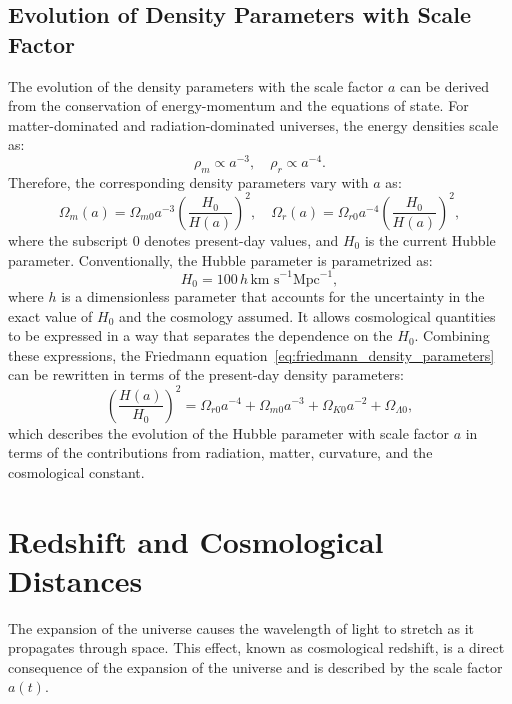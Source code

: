 \subsection{Evolution of Density Parameters with Scale Factor}
The evolution of the density parameters with the scale factor \( a \) can be derived from the conservation of energy-momentum and the equations of state. For matter-dominated and radiation-dominated universes, the energy densities scale as:
\begin{equation}
    \rho_m \propto a^{-3}, \quad \rho_r \propto a^{-4}.
    \label{eq:energy_density_scaling}
\end{equation}
Therefore, the corresponding density parameters vary with \( a \) as:
\begin{equation}
    \Omega_m(a) = \Omega_{m0} a^{-3} \left( \frac{H_0}{H(a)} \right)^2, \quad \Omega_r(a) = \Omega_{r0} a^{-4} \left( \frac{H_0}{H(a)} \right)^2,
    \label{eq:density_parameters_evolution}
\end{equation}
where the subscript \( 0 \) denotes present-day values, and \( H_0 \) is the current Hubble parameter. Conventionally, the Hubble parameter is parametrized as:
\begin{equation}
    H_0 = 100 \, h \, \text{km s}^{-1} \text{Mpc}^{-1},
    \label{eq:hubble_parameter_current}
\end{equation}
where \( h \) is a dimensionless parameter that accounts for the uncertainty in the exact value of \( H_0 \) and the cosmology assumed. It allows cosmological quantities to be expressed in a way that separates the dependence on the $H_0$.
Combining these expressions, the Friedmann equation~\eqref{eq:friedmann_density_parameters} can be rewritten in terms of the present-day density parameters:
\begin{equation}
    \left( \frac{H(a)}{H_0} \right)^2 = \Omega_{r0} a^{-4} + \Omega_{m0} a^{-3} + \Omega_{K0} a^{-2} + \Omega_{\Lambda0},
    \label{eq:friedmann_rewritten}
\end{equation}
which describes the evolution of the Hubble parameter with scale factor \( a \) in terms of the contributions from radiation, matter, curvature, and the cosmological constant.

\section{Redshift and Cosmological Distances}
The expansion of the universe causes the wavelength of light to stretch as it propagates through space. This effect, known as cosmological redshift, is a direct consequence of the expansion of the universe and is described by the scale factor \( a(t) \). 

